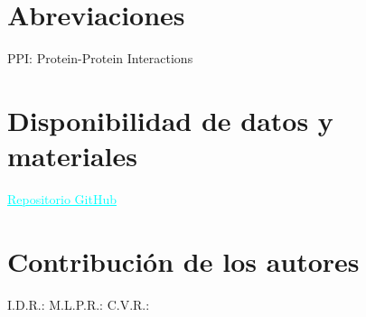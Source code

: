 \documentclass{bmcart}
\begin{document}
	\begin{backmatter}
	
		\section*{Abreviaciones}%
			
			PPI: Protein-Protein Interactions
		
		\section*{Disponibilidad de datos y materiales}%
			
			\href{https://github.com/Ines-Diaz/project_template}{\textcolor{Cyan}{\underline{Repositorio GitHub}}}
		
		\section*{Contribución de los autores}
			
			 I.D.R.:
			 \newline
			 M.L.P.R.:
			 \newline
			 C.V.R.:
		
		
		
	
	\end{backmatter}
\end{document}
